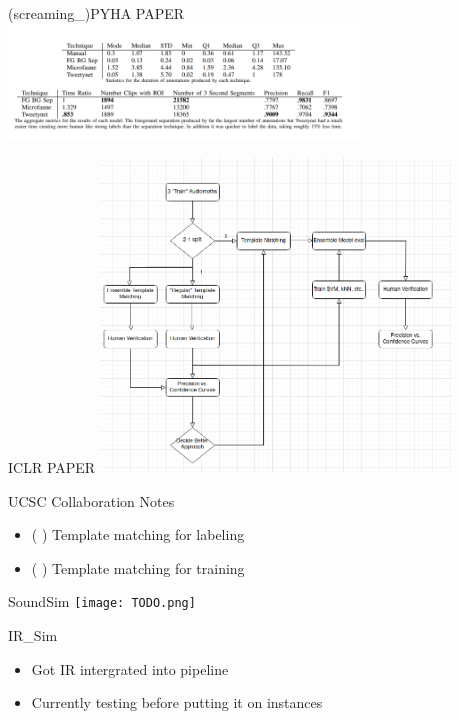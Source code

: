 \begin{frame}{(screaming_)PYHA PAPER}
    \centering
    \includegraphics[height=0.7\textheight,width=0.7\textwidth,keepaspectratio]{model_performance_01_23.png}
\end{frame}

\begin{frame}{ICLR PAPER}
    \centering
    \includegraphics[height=0.7\textheight,width=0.7\textwidth,keepaspectratio]{ICLR_WORKFLOW.png}
\end{frame}

\begin{frame}{UCSC Collaboration Notes}
    \begin{itemize}
        \item ( ) Template matching for labeling
        \item ( ) Template matching for training
    \end{itemize}    
\end{frame}

\begin{frame}{SoundSim}
    \centering
    \texttt{[image: TODO.png]}
\end{frame}

\begin{frame}{IR_Sim}
    \begin{itemize}
        \item Got IR intergrated into pipeline
        \item Currently testing before putting it on instances
    \end{itemize}    
\end{frame}

